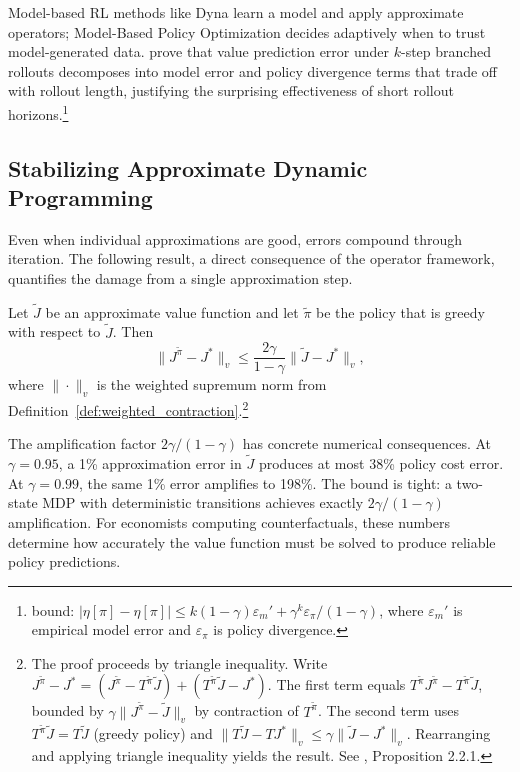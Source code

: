 Model-based RL methods like Dyna \citep{sutton2018} learn a model and apply approximate operators; Model-Based Policy Optimization \citep{janner2019model} decides adaptively when to trust model-generated data. \citet{janner2019model} prove that value prediction error under $k$-step branched rollouts decomposes into model error and policy divergence terms that trade off with rollout length, justifying the surprising effectiveness of short rollout horizons.\footnote{\citet{janner2019model} bound: $|\eta[\pi] - \hat{\eta}[\pi]| \leq k(1-\gamma)\varepsilon_m' + \gamma^k \varepsilon_\pi / (1-\gamma)$, where $\varepsilon_m'$ is empirical model error and $\varepsilon_\pi$ is policy divergence.}


\subsection{Stabilizing Approximate Dynamic Programming}
\label{sec:stabilizing_adp}

Even when individual approximations are good, errors compound through iteration. The following result, a direct consequence of the operator framework, quantifies the damage from a single approximation step.

\begin{theorem}
\label{thm:one_step_lookahead}
Let $\tilde{J}$ be an approximate value function and let $\tilde{\pi}$ be the policy that is greedy with respect to $\tilde{J}$. Then
\[
\|J^{\tilde{\pi}} - J^*\|_v \leq \frac{2\gamma}{1-\gamma} \|\tilde{J} - J^*\|_v,
\]
where $\|\cdot\|_v$ is the weighted supremum norm from Definition~\ref{def:weighted_contraction}.\footnote{The proof proceeds by triangle inequality. Write $J^{\tilde{\pi}} - J^* = (J^{\tilde{\pi}} - T^{\tilde{\pi}}\tilde{J}) + (T^{\tilde{\pi}}\tilde{J} - J^*)$. The first term equals $T^{\tilde{\pi}}J^{\tilde{\pi}} - T^{\tilde{\pi}}\tilde{J}$, bounded by $\gamma\|J^{\tilde{\pi}} - \tilde{J}\|_v$ by contraction of $T^{\tilde{\pi}}$. The second term uses $T^{\tilde{\pi}}\tilde{J} = T\tilde{J}$ (greedy policy) and $\|T\tilde{J} - TJ^*\|_v \leq \gamma\|\tilde{J} - J^*\|_v$. Rearranging and applying triangle inequality yields the result. See \citet{bertsekas2022}, Proposition 2.2.1.}
\end{theorem}

The amplification factor $2\gamma/(1-\gamma)$ has concrete numerical consequences. At $\gamma = 0.95$, a 1\% approximation error in $\tilde{J}$ produces at most 38\% policy cost error. At $\gamma = 0.99$, the same 1\% error amplifies to 198\%. The bound is tight: a two-state MDP with deterministic transitions achieves exactly $2\gamma/(1-\gamma)$ amplification. For economists computing counterfactuals, these numbers determine how accurately the value function must be solved to produce reliable policy predictions.

